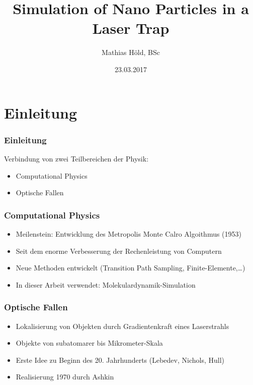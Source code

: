\documentclass{beamer}
\begin{document}
\title{Simulation of Nano Particles in a Laser Trap}
\author{Mathias Höld, BSc}
\date{23.03.2017}
\begin{frame}
\titlepage
\end{frame}

\begin{frame}
\tableofcontents
\end{frame}

\section{Einleitung}
\begin{frame}
\frametitle{Einleitung}
Verbindung von zwei Teilbereichen der Physik:
\begin{itemize}
\item Computational Physics
\item Optische Fallen
\end{itemize}
\end{frame}

\begin{frame}
\frametitle{Computational Physics}
\begin{itemize}
\item Meilenstein: Entwicklung des Metropolis Monte Calro Algoithmus (1953)
\item Seit dem enorme Verbesserung der Rechenleistung von Computern 
\item Neue Methoden entwickelt (Transition Path Sampling, Finite-Elemente,\ldots)
\item In dieser Arbeit verwendet: Molekulardynamik-Simulation
\end{itemize}
\end{frame}

\begin{frame}
\frametitle{Optische Fallen}
\begin{itemize}
\item Lokalisierung von Objekten durch Gradientenkraft eines Laserstrahls
\item Objekte von subatomarer bis Mikrometer-Skala
\item Erste Idee zu Beginn des 20. Jahrhunderts (Lebedev, Nichols, Hull)
\item Realisierung 1970 durch Ashkin
\end{itemize}
\end{frame}
\end{document}
